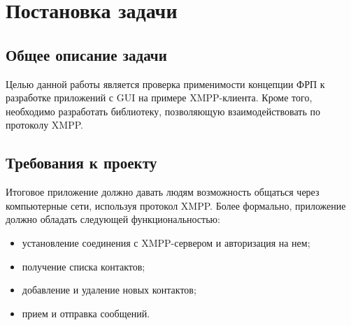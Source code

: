 \section{Постановка задачи}
\subsection{Общее описание задачи}
Целью данной работы является проверка применимости концепции ФРП к разработке приложений с GUI на примере XMPP-клиента.
Кроме того, необходимо разработать библиотеку, позволяющую взаимодействовать по протоколу XMPP.

\subsection{Требования к проекту}
Итоговое приложение должно давать людям возможность общаться через компьютерные сети, используя протокол XMPP.
Более формально, приложение должно обладать следующей функциональностью:
\begin{itemize}
    \item установление соединения с XMPP-сервером и авторизация на нем;
    \item получение списка контактов;
    \item добавление и удаление новых контактов;
    \item прием и отправка сообщений.
\end{itemize}